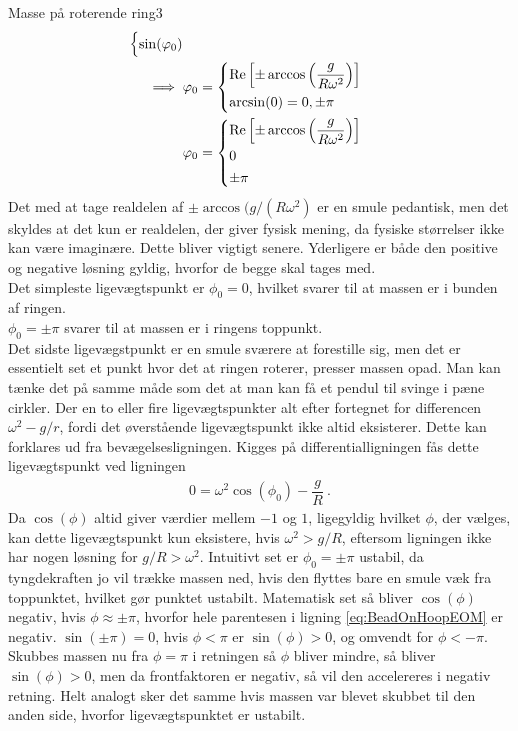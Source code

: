 \begin{opgave}{Masse på roterende ring}{3}
\begin{align*}
\begin{cases}
	\sin(\phi_0) \end{cases} \\
	\implies \phi_0 &= \begin{cases}
	\mathrm{Re}\left[\pm\arccos\left(\dfrac{g}{R\omega^2}\right)\right] \vspace{1mm} \\
	\arcsin(0) = 0,\pm\pi
	\end{cases} \\
	\phi_0 &= \begin{cases}
	\mathrm{Re}\left[\pm\arccos\left(\dfrac{g}{R\omega^2}\right)\right] \vspace{.5mm} \\
	0 \vspace{.5mm} \\
	\pm\pi
	\end{cases}
\end{align*}
Det med at tage realdelen af $\pm\arccos(g/(R\omega^2)$ er en smule pedantisk, men det skyldes at det kun er realdelen, der giver fysisk mening, da fysiske størrelser ikke kan være imaginære. Dette bliver vigtigt senere. Yderligere er både den positive og negative løsning gyldig, hvorfor de begge skal tages med. \vspace{2mm}\\
Det simpleste ligevægtspunkt er $\phi_0 = 0$, hvilket svarer til at massen er i bunden af ringen. \\
$\phi_0 = \pm\pi$ svarer til at massen er i ringens toppunkt. \\
Det sidste ligevægstpunkt er en smule sværere at forestille sig, men det er essentielt set et punkt hvor det at ringen roterer, presser massen opad. Man kan tænke det på samme måde som det at man kan få et pendul til svinge i pæne cirkler.
\opg Der en to eller fire ligevægtspunkter alt efter fortegnet for differencen $\omega^2 - g/r$, fordi det øverstående ligevægtspunkt ikke altid eksisterer. Dette kan forklares ud fra bevægelsesligningen. Kigges på differentialligningen fås dette ligevægtspunkt ved ligningen
\begin{align} \label{eq:phi0_def}
	0 = \omega^2\cos(\phi_0) - \dfrac{g}{R} \: .
\end{align}
Da $\cos(\phi)$ altid giver værdier mellem $-1$ og $1$, ligegyldig hvilket $\phi$, der vælges, kan dette ligevægtspunkt kun eksistere, hvis $\omega^2>g/R$, eftersom ligningen ikke har nogen løsning for $g/R>\omega^2$.
\opg Intuitivt set er $\phi_0=\pm\pi$ ustabil, da tyngdekraften jo vil trække massen ned, hvis den flyttes bare en smule væk fra toppunktet, hvilket gør punktet ustabilt. Matematisk set så bliver $\cos(\phi)$ negativ, hvis $\phi\approx\pm\pi$, hvorfor hele parentesen i ligning \eqref{eq:BeadOnHoopEOM} er negativ. $\sin(\pm\pi)=0$, hvis $\phi<\pi$ er $\sin(\phi)>0$, og omvendt for $\phi<-\pi$. Skubbes massen nu fra $\phi=\pi$ i retningen så $\phi$ bliver mindre, så bliver $\sin(\phi)>0$, men da frontfaktoren er negativ, så vil den accelereres i negativ retning. Helt analogt sker det samme hvis massen var blevet skubbet til den anden side, hvorfor ligevægtspunktet er ustabilt. \\[2mm]

\end{opgave}
